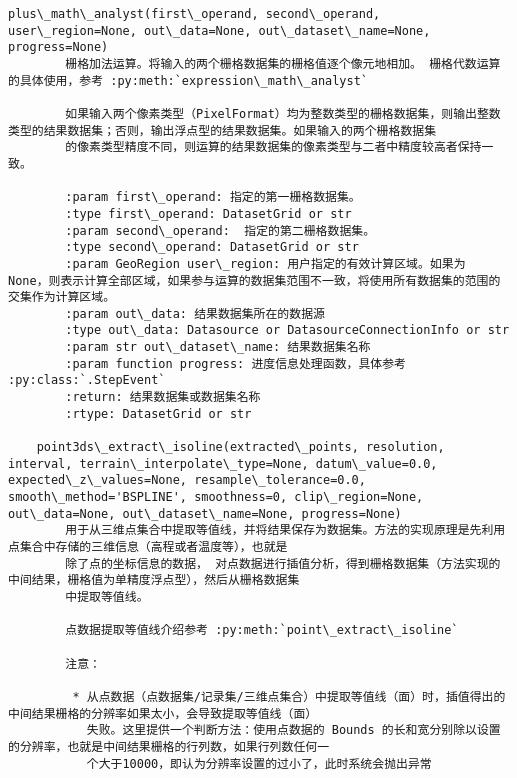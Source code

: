 \documentclass[11pt]{article}
\begin{document}
\begin{Verbatim}[commandchars=\\\{\}]
    plus\_math\_analyst(first\_operand, second\_operand, user\_region=None, out\_data=None, out\_dataset\_name=None, progress=None)
        栅格加法运算。将输入的两个栅格数据集的栅格值逐个像元地相加。 栅格代数运算的具体使用，参考 :py:meth:`expression\_math\_analyst`
        
        如果输入两个像素类型（PixelFormat）均为整数类型的栅格数据集，则输出整数类型的结果数据集；否则，输出浮点型的结果数据集。如果输入的两个栅格数据集
        的像素类型精度不同，则运算的结果数据集的像素类型与二者中精度较高者保持一致。
        
        :param first\_operand: 指定的第一栅格数据集。
        :type first\_operand: DatasetGrid or str
        :param second\_operand:  指定的第二栅格数据集。
        :type second\_operand: DatasetGrid or str
        :param GeoRegion user\_region: 用户指定的有效计算区域。如果为 None，则表示计算全部区域，如果参与运算的数据集范围不一致，将使用所有数据集的范围的交集作为计算区域。
        :param out\_data: 结果数据集所在的数据源
        :type out\_data: Datasource or DatasourceConnectionInfo or str
        :param str out\_dataset\_name: 结果数据集名称
        :param function progress: 进度信息处理函数，具体参考 :py:class:`.StepEvent`
        :return: 结果数据集或数据集名称
        :rtype: DatasetGrid or str
    
    point3ds\_extract\_isoline(extracted\_points, resolution, interval, terrain\_interpolate\_type=None, datum\_value=0.0, expected\_z\_values=None, resample\_tolerance=0.0, smooth\_method='BSPLINE', smoothness=0, clip\_region=None, out\_data=None, out\_dataset\_name=None, progress=None)
        用于从三维点集合中提取等值线，并将结果保存为数据集。方法的实现原理是先利用点集合中存储的三维信息（高程或者温度等），也就是
        除了点的坐标信息的数据， 对点数据进行插值分析，得到栅格数据集（方法实现的中间结果，栅格值为单精度浮点型），然后从栅格数据集
        中提取等值线。
        
        点数据提取等值线介绍参考 :py:meth:`point\_extract\_isoline`
        
        注意：
        
         * 从点数据（点数据集/记录集/三维点集合）中提取等值线（面）时，插值得出的中间结果栅格的分辨率如果太小，会导致提取等值线（面）
           失败。这里提供一个判断方法：使用点数据的 Bounds 的长和宽分别除以设置的分辨率，也就是中间结果栅格的行列数，如果行列数任何一
           个大于10000，即认为分辨率设置的过小了，此时系统会抛出异常
        

\end{Verbatim}
\end{document}
